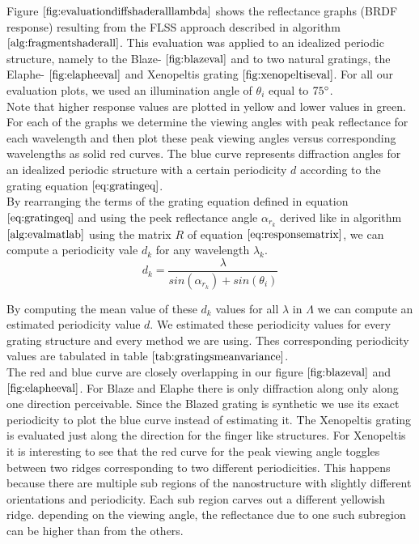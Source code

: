 Figure $\ref{fig:evaluationdiffshaderalllambda}$ shows the reflectance graphs (BRDF response) resulting from the FLSS approach described in algorithm $\ref{alg:fragmentshaderall}$. This evaluation was applied to an idealized periodic structure, namely to the Blaze- $\ref{fig:blazeval}$ and to two natural gratings, the Elaphe- $\ref{fig:elapheeval}$ and Xenopeltis grating $\ref{fig:xenopeltiseval}$. For all our evaluation plots, we used an illumination angle of $\theta_i$ equal to $75\degree$. \\

Note that higher response values are plotted in yellow and lower values in green. For each of the graphs we determine the viewing angles with peak reflectance for each wavelength and then plot these peak viewing angles versus corresponding wavelengths as solid red curves. The blue curve represents diffraction angles for an idealized periodic structure with a certain periodicity $d$ according to the grating equation $\ref{eq:gratingeq}$. \\

By rearranging the terms of the grating equation defined in equation $\ref{eq:gratingeq}$ and using the peek reflectance angle $\alpha_{r_k}$ derived like in algorithm $\ref{alg:evalmatlab}$ using the matrix $R$ of equation $\ref{eq:responsematrix}$, we can compute a periodicity vale $d_k$ for any wavelength $\lambda_k$.  
\begin{equation}
  d_k = \frac{\lambda}{sin(\alpha_{r_k}) + sin(\theta_i)}
\end{equation}

By computing the mean value of these $d_k$ values for all $\lambda$ in $\Lambda$ we can compute an estimated periodicity value $d$. We estimated these periodicity values for every grating structure and every method we are using. Thes corresponding periodicity values are tabulated in table $\ref{tab:gratingsmeanvariance}$. \\

The red and blue curve are closely overlapping in our figure $\ref{fig:blazeval}$ and $\ref{fig:elapheeval}$. For Blaze and Elaphe there is only diffraction along only along one direction perceivable. Since the Blazed grating is synthetic we use its exact periodicity to plot the blue curve instead of estimating it. The Xenopeltis grating is evaluated just along the direction for the finger like structures. For Xenopeltis it is interesting to see that the red curve for the peak viewing angle toggles between two ridges corresponding to two different periodicities. This happens because there are multiple sub regions of the nanostructure with slightly different orientations and periodicity. Each sub region carves out a different yellowish ridge. depending on the viewing angle, the reflectance due to one such subregion can be higher than from the others. \\

